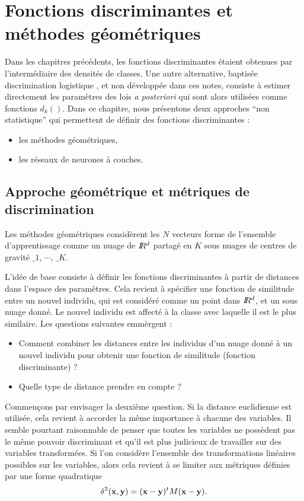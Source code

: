 \chapter{Fonctions discriminantes et m\'ethodes g\'eom\'etriques}

Dans les chapitres pr\'ec\'edents, les fonctions discriminantes \'etaient obtenues
par l'interm\'ediaire des densit\'es de classes. Une autre alternative,
baptis\'ee discrimination logistique \cite{Ripley1996}, et non d\'evelopp\'ee
dans ces notes,  consiste \`a estimer  directement les param\`etres des lois 
{\em a posteriori} qui sont alors utilis\'ees comme fonctions $d_k()$.
Dans ce chapitre, nous pr\'esentons deux  approches ``non statistique''
qui permettent de d\'efinir des fonctions discriminantes :
\begin{itemize}
\item  les m\'ethodes g\'eom\'etriques, 
\item  les r\'eseaux de neurones \`a couches. 
\end{itemize}   

\section{Approche g\'eom\'etrique et m\'etriques de discrimination}

Les m\'ethodes g\'eom\'etriques consid\`erent les $N$ vecteurs forme
de l'ensemble d'apprentissage comme un nuage de $I\!\!R^d$ partag\'e
en $K$ sous nuages de centres de gravit\'e $\bm_1$, $\cdots$, $\bm_K$. 

L'id\'ee de base consiste \`a d\'efinir les fonctions discriminantes
\`a partir de distances dans l'espace des param\`etres. Cela
revient \`a sp\'ecifier une fonction de similitude entre un
nouvel individu, qui est consid\'er\'e comme un point dans $I\!\!R^d$, 
et un sous nuage donn\'e. Le nouvel individu est affect\'e \`a la classe
avec laquelle il est le plus similaire.  Les questions suivantes emm\`ergent :
\begin{itemize}
\item
Comment combiner les distances entre les individus d'un nuage donn\'e
\`a  un nouvel individu pour obtenir une fonction de similitude (fonction discriminante) ?
\item
Quelle type de distance prendre en compte  ?
\end{itemize}   
Commen\c{c}ons par envisager la deuxi\`eme question. Si la distance
euclidienne est utilis\'ee, cela revient \`a accorder la m\^eme 
importance \`a chacune des variables.  Il semble pourtant raisonnable
de penser que toutes les variables ne poss\`edent pas le m\^eme pouvoir
discriminant et qu'il est plus judicieux de travailler sur des variables
transform\'ees. Si l'on consid\`ere l'ensemble
des transformations lin\'eaires possibles sur les variables, alors
cela revient \`a se limiter aux m\'etriques d\'efinies par une 
forme quadratique
$$
\delta^2(\mbox{\bf x},\mbox{\bf y})= (\mbox{\bf x}-\mbox{\bf y})^t M (\mbox{\bf x}-\mbox{\bf y}).
$$    

